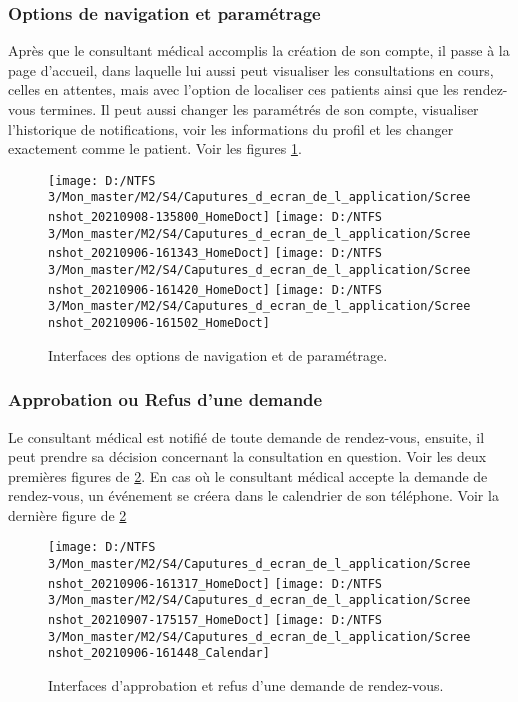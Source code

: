 \subsubsection{Options de navigation et paramétrage}
Après que le consultant médical accomplis la création de son compte, il passe à la page d'accueil, dans laquelle lui aussi peut visualiser les consultations en cours, celles en attentes, mais avec l'option de localiser ces patients ainsi que les rendez-vous termines. Il peut aussi changer les paramétrés de son compte, visualiser l'historique de notifications, voir les informations du profil et les changer exactement comme le patient. Voir les figures \ref{Figure 5.7}.
\begin{figure}[!h]
	\texttt{[image: D:/NTFS 3/Mon\_master/M2/S4/Caputures\_d\_ecran\_de\_l\_application/Screenshot\_20210908-135800\_HomeDoct]}
	\texttt{[image: D:/NTFS 3/Mon\_master/M2/S4/Caputures\_d\_ecran\_de\_l\_application/Screenshot\_20210906-161343\_HomeDoct]}
	\texttt{[image: D:/NTFS 3/Mon\_master/M2/S4/Caputures\_d\_ecran\_de\_l\_application/Screenshot\_20210906-161420\_HomeDoct]}
	\texttt{[image: D:/NTFS 3/Mon\_master/M2/S4/Caputures\_d\_ecran\_de\_l\_application/Screenshot\_20210906-161502\_HomeDoct]}
	\centering
	\caption{Interfaces des options de navigation et de paramétrage.}
	\label{Figure 5.7}
\end{figure}
\subsubsection{Approbation ou Refus d'une demande}
Le consultant médical est notifié de toute demande de rendez-vous, ensuite, il peut prendre sa décision concernant la consultation en question. Voir les deux premières figures de \ref{Figure 5.8}. En cas où le consultant médical accepte la demande de rendez-vous, un événement se créera dans le calendrier de son téléphone. Voir la dernière figure de \ref{Figure 5.8}
\begin{figure}[h]
	\texttt{[image: D:/NTFS 3/Mon\_master/M2/S4/Caputures\_d\_ecran\_de\_l\_application/Screenshot\_20210906-161317\_HomeDoct]}
	\texttt{[image: D:/NTFS 3/Mon\_master/M2/S4/Caputures\_d\_ecran\_de\_l\_application/Screenshot\_20210907-175157\_HomeDoct]}
	\texttt{[image: D:/NTFS 3/Mon\_master/M2/S4/Caputures\_d\_ecran\_de\_l\_application/Screenshot\_20210906-161448\_Calendar]}
	\centering
	\caption{Interfaces d'approbation et refus d'une demande de rendez-vous.}
	\label{Figure 5.8}
\end{figure}
